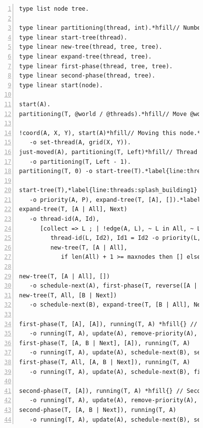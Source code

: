 \begin{figure}[!htb]
\begin{Verbatim}[numbers=left,commandchars=*\{\},fontsize=\codesize]
type list node tree.

type linear partitioning(thread, int).*hfill// Number of nodes to receive.
type linear start-tree(thread).
type linear new-tree(thread, tree, tree).
type linear expand-tree(thread, tree).
type linear first-phase(thread, tree, tree).
type linear second-phase(thread, tree).
type linear start(node).

start(A).
partitioning(T, @world / @threads).*hfill// Move @world/@threads nodes.

!coord(A, X, Y), start(A)*hfill// Moving this node.*label{line:threads:splash_part1}
   -o set-thread(A, grid(X, Y)).
just-moved(A), partitioning(T, Left)*hfill// Thread received another node.
   -o partitioning(T, Left - 1).
partitioning(T, 0) -o start-tree(T).*label{line:threads:splash_part2}*label{line:threads:splash_first}

start-tree(T),*label{line:threads:splash_building1} priority(A, P), P > 0.0 *hfill{} // Tree building
   -o priority(A, P), expand-tree(T, [A], []).*label{line:threads:splash_building2}
expand-tree(T, [A | All], Next)
   -o thread-id(A, Id),
      [collect => L ; | !edge(A, L), ~ L in All, ~ L in Next,*label{line:threads:splash_agg1} priority(L, P), P > 0.0,
         thread-id(L, Id2), Id1 = Id2 -o priority(L, P), thread-id(L, Id2) ->
         new-tree(T, [A | All],
            if len(All) + 1 >= maxnodes then [] else Next ++ L end)].*label{line:threads:splash_agg2}*label{line:threads:splash_next}

new-tree(T, [A | All], [])
   -o schedule-next(A), first-phase(T, reverse([A | All]), [A | All]).*label{line:threads:splash_first_phase}
new-tree(T, All, [B | Next])
   -o schedule-next(B), expand-tree(T, [B | All], Next).

first-phase(T, [A], [A]), running(T, A) *hfill{} // First phase
   -o running(T, A), update(A), remove-priority(A), start-tree(T).
first-phase(T, [A, B | Next], [A]), running(T, A)
   -o running(T, A), update(A), schedule-next(B), second-phase(T, [B | Next]).*label{line:threads:splash_first_update1}
first-phase(T, All, [A, B | Next]), running(T, A)
   -o running(T, A), update(A), schedule-next(B), first-phase(T, All, [B | Next]).*label{line:threads:splash_first_update2}

second-phase(T, [A]), running(T, A) *hfill{} // Second phase
   -o running(T, A), update(A), remove-priority(A), start-tree(T).*label{line:threads:splash_second_update1}
second-phase(T, [A, B | Next]), running(T, A)
   -o running(T, A), update(A), schedule-next(B), second-phase(T, [B | Next]).*label{line:threads:splash_second_update2}
\end{Verbatim}

  \label{code:threads:sbp}
\end{figure}

